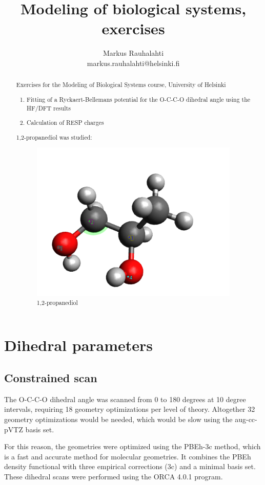 \documentclass[10pt]{article}
\title{Modeling of biological systems, exercises}
\author{Markus Rauhalahti\\
	markus.rauhalahti@helsinki.fi}
\begin{document}
\maketitle
\tableofcontents

\begin{abstract}
	\noindent Exercises for the Modeling of Biological Systems course, University of Helsinki
	\begin{enumerate}
	\item Fitting of a Ryckaert-Bellemans potential for the O-C-C-O dihedral angle using the HF/DFT results
	\item Calculation of RESP charges
	\end{enumerate}
	1,2-propanediol was studied:
	
	\begin{figure}[ht!]
		\centering
		\includegraphics[width=0.5\linewidth]{fig/mol}
		\caption{1,2-propanediol}
		\label{fig:mol}
	\end{figure}
	
\end{abstract}



\newpage



\section{Dihedral parameters}

\subsection{Constrained scan}

The O-C-C-O dihedral angle was scanned from 0 to 180 degrees at 10 degree intervals, requiring 18 geometry optimizations per level of theory. Altogether 32 geometry optimizations would be needed, which would be slow using the aug-cc-pVTZ basis set.

For this reason, the geometries were optimized using the  PBEh-3c method, which is a fast and accurate method for molecular geometries\cite{pbeh3c}. It combines the PBEh density functional with three empirical corrections (3c) and a minimal basis set. These dihedral scans were performed using the ORCA 4.0.1 program\cite{orca}.
\end{document}
